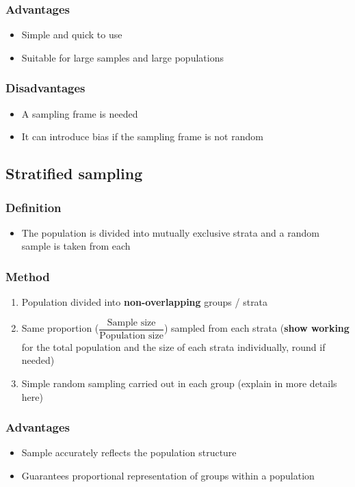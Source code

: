 \subsubsection{Advantages}
\begin{itemize}
	\item Simple and quick to use
	\item Suitable for large samples and large populations
\end{itemize}
\subsubsection{Disadvantages}
\begin{itemize}
	\item A sampling frame is needed
	\item It can introduce bias if the sampling frame is not random
\end{itemize}
\subsection{Stratified sampling}
\subsubsection{Definition}
\begin{itemize}
	\item The population is divided into mutually exclusive strata and a random sample is taken from each
\end{itemize}
\subsubsection{Method}
\begin{enumerate}
	\item Population divided into \textbf{non-overlapping} groups / strata
	\item Same proportion ($\dfrac{\text{Sample size}}{\text{Population size}}$) sampled from each strata (\textbf{show working} for the total population and the size of each strata individually, round if needed)
	\item Simple random sampling carried out in each group (explain in more details here)
\end{enumerate}
\subsubsection{Advantages}
\begin{itemize}
	\item Sample accurately reflects the population structure
	\item Guarantees proportional representation of groups within a population
\end{itemize}
